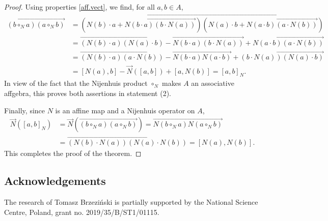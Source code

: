 \documentclass[pdftex]{sigma}
\numberwithin{equation}{section}
\begin{document}
\begin{proof}
Using properties \eqref{aff.vect}, we find, for all $a,b\in A$,
\begin{align*}
 \overrightarrow{(b\circ_N a)(a\circ_N b)}
 &= \overrightarrow{\left(N(b)\cdot a + \overrightarrow{N(b\cdot a)(b\cdot N(a))}\right)\left(N(a)\cdot b + \overrightarrow{N(a\cdot b)(a\cdot N(b))}\right)}\\
 &= \overrightarrow{(N(b)\cdot a)(N(a)\cdot b)}-\overrightarrow{N(b\cdot a)(b\cdot N(a))}+ \overrightarrow{N(a\cdot b)(a\cdot N(b))}\\
 &= \overrightarrow{(N(b)\cdot a)(a\cdot N(b))}-\overrightarrow{N(b\cdot a)N(a\cdot b)}+ \overrightarrow{(b\cdot N(a))(N(a)\cdot b)}\\
 &=[N(a),b] -\vec{N}([a,b]) + [a, N(b)] =[a,b]_N.
\end{align*}
In view of the fact that the Nijenhuis product $\circ_N$ makes $A$ an associative affgebra, this proves both assertions in statement (2).

Finally, since $N$ is an affine map and a Nijenhuis operator on $A$,
\begin{align*}
\vec{N}([a,b]_N) &=\vec{N}\left( \overrightarrow{(b\circ_N a)(a\circ_N b)}\right) =\overrightarrow{N(b\circ_N a)N(a\circ_N b)}\\
 &= \overrightarrow{\left(N(b)\cdot N(a)\right)\left(N(a)\cdot N (b)\right)} = [N(a),N(b)].
\end{align*}
This completes the proof of the theorem.
\end{proof}

\subsection*{Acknowledgements}
The research of Tomasz Brzezi\'nski is partially supported by the National Science Centre, Poland, grant no. 2019/35/B/ST1/01115.
\end{document}

